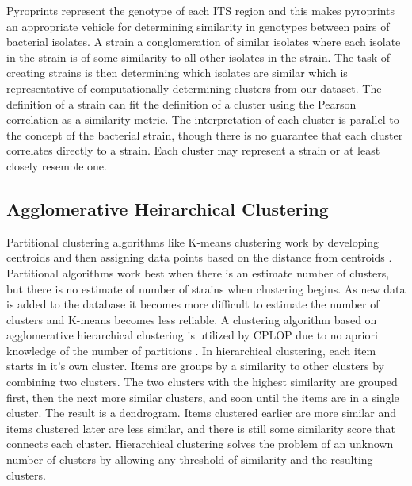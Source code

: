 Pyroprints represent the genotype of each ITS region and this makes pyroprints an appropriate vehicle for determining similarity in genotypes between pairs of bacterial isolates. A strain a conglomeration of similar isolates where each isolate in the strain is of some similarity to all other isolates in the strain. The task of creating strains is then determining which isolates are similar which is representative of computationally determining clusters from our dataset. The definition of a strain can fit the definition of a cluster using the Pearson correlation as a similarity metric. The interpretation of each cluster is parallel to the concept of the bacterial strain, though there is no guarantee that each cluster correlates directly to a strain. Each cluster may represent a strain or at least closely resemble one.

\subsection{Agglomerative Heirarchical Clustering}

Partitional clustering algorithms like K-means clustering work by developing centroids and then assigning data points based on the distance from centroids \cite{Liu}. Partitional algorithms work best when there is an estimate number of clusters, but there is no estimate of number of strains when clustering begins. As new data is added to the database it becomes more diﬃcult to estimate the number of clusters and K-means becomes less reliable. A clustering algorithm based on agglomerative hierarchical clustering is utilized by CPLOP due to no apriori knowledge of the number of partitions \cite{JanSoliman}. In hierarchical clustering, each item starts in it’s own cluster. Items are groups by a similarity to other clusters by combining two clusters. The two clusters with the highest similarity are grouped ﬁrst, then the next more similar clusters, and soon until the items are in a single cluster. The result is a dendrogram. Items clustered earlier are more similar and items clustered later are less similar, and there is still some similarity score that connects each cluster. Hierarchical clustering solves the problem of an unknown number of clusters by allowing any threshold of similarity and the resulting clusters.
